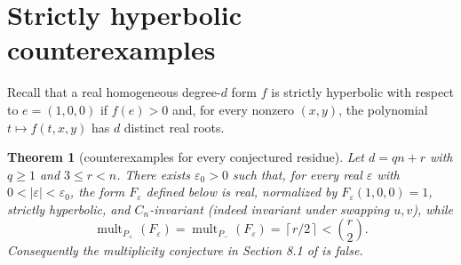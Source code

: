 \documentclass[11pt]{article}
\newtheorem{theorem}{Theorem}
\newcommand{\ceil}[1]{\left\lceil #1\right\rceil}
\begin{document}
\section{Strictly hyperbolic counterexamples}

Recall that a real homogeneous degree-$d$ form $f$ is strictly hyperbolic
with respect to $e=(1,0,0)$ if $f(e)>0$ and, for every nonzero $(x,y)$, the
polynomial $t\mapsto f(t,x,y)$ has $d$ distinct real roots.

\begin{theorem}[counterexamples for every conjectured residue]\label{thm:counter}
Let $d=qn+r$ with $q\geq1$ and $3\leq r<n$.  There exists $\varepsilon_0>0$
such that, for every real $\varepsilon$ with
$0<|\varepsilon|<\varepsilon_0$, the form $F_\varepsilon$ defined below is
real, normalized by $F_\varepsilon(1,0,0)=1$, strictly hyperbolic, and
$C_n$-invariant (indeed invariant under swapping $u,v$), while
\[
 \operatorname{mult}_{P_+}(F_\varepsilon)
 =\operatorname{mult}_{P_-}(F_\varepsilon)
 =\ceil{r/2}<\binom r2.
\]
Consequently the multiplicity conjecture in Section 8.1 of
\cite{SimonVinzant} is false.
\end{theorem}
\end{document}

